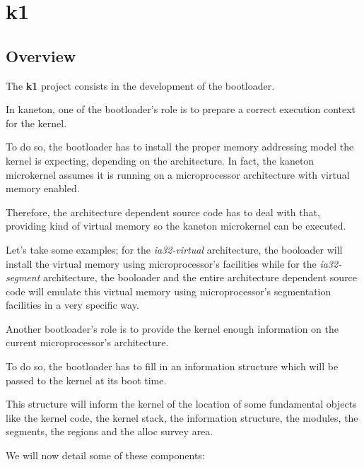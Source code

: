 
%
%

\section{k1}

%
%

\subsection{Overview}

The \textbf{k1} project consists in the development of the bootloader.

In kaneton, one of the bootloader's role is to prepare a correct
execution context for the kernel.

To do so, the bootloader has to install the proper memory addressing model
the kernel is expecting, depending on the architecture. In fact, the
kaneton microkernel assumes it is running on a microprocessor architecture
with virtual memory enabled.

Therefore, the architecture dependent source code has to deal with that,
providing kind of virtual memory so the kaneton microkernel can be executed.

Let's take some examples; for the \textit{ia32-virtual} architecture,
the booloader will install the virtual memory using microprocessor's
facilities while for the \textit{ia32-segment} architecture, the booloader
and the entire architecture dependent source code will emulate this
virtual memory using microprocessor's segmentation facilities in a very
specific way.

Another bootloader's role is to provide the kernel enough information
on the current microprocessor's architecture.

To do so, the bootloader has to fill in an information structure which
will be passed to the kernel at its boot time.

This structure will inform the kernel of the location of some
fundamental objects like the kernel code, the kernel stack, the information
structure, the modules, the segments, the regions and the alloc survey area.

We will now detail some of these components:


